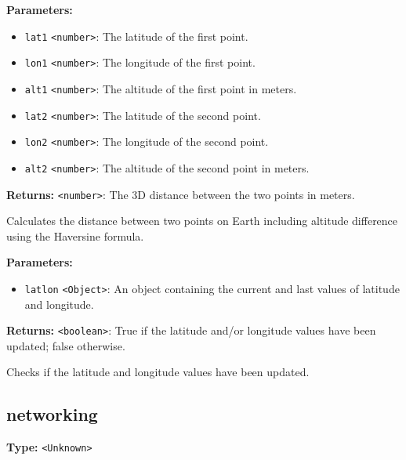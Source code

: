 \documentclass[12pt,a4paper]{article}
\begin{document}
\noindent \textbf{Parameters:}
\begin{itemize}
  \item \texttt{lat1} \texttt{<number>}: The latitude of the first point.
  \item \texttt{lon1} \texttt{<number>}: The longitude of the first point.
  \item \texttt{alt1} \texttt{<number>}: The altitude of the first point in meters.
  \item \texttt{lat2} \texttt{<number>}: The latitude of the second point.
  \item \texttt{lon2} \texttt{<number>}: The longitude of the second point.
  \item \texttt{alt2} \texttt{<number>}: The altitude of the second point in meters.
\end{itemize}

\noindent \textbf{Returns:} \texttt{<number>}: The 3D distance between the two points in meters.

\noindent Calculates the distance between two points on Earth including altitude difference using the Haversine formula.

\vspace{5mm}
\noindent {}


\noindent \textbf{Parameters:}
\begin{itemize}
  \item \texttt{latlon} \texttt{<Object>}: An object containing the current and last values of latitude and longitude.
\end{itemize}

\noindent \textbf{Returns:} \texttt{<boolean>}: True if the latitude and/or longitude values have been updated; false otherwise.

\noindent Checks if the latitude and longitude values have been updated.


\subsection{networking}
\vspace{5mm}
\noindent {}\vspace{4mm}


\noindent \textbf{Type:} \texttt{<Unknown>}
\end{document}
